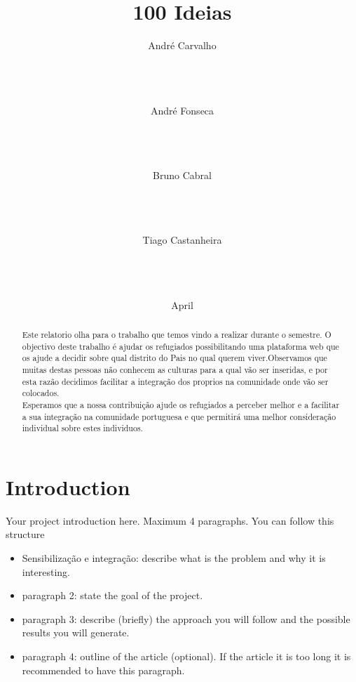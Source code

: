 \documentclass{article}
\title{100 Ideias}
\author{
%
%
\alignauthor
André Carvalho\\
       \affaddr{FCUP - DCC}\\
       \affaddr{Motivation Coach}\\
       \affaddr{Documenter}\\
\and
\alignauthor
André Fonseca\\
       \affaddr{FCUP - DCC}\\
       \affaddr{Task Master}\\
       \affaddr{Developer}\\
\and
\alignauthor Bruno Cabral\\
       \affaddr{FCUP - DCC}\\
       \affaddr{Resources Support}\\
       \affaddr{Researcher}\\
\and  %
\alignauthor Tiago Castanheira\\
       \affaddr{FCUP - DCC}\\
       \affaddr{Mediator}\\
       \affaddr{Architect}\\
}
\date{April}
\begin{document}
\maketitle
\begin{abstract}
    Este relatorio olha para o trabalho que temos vindo a realizar durante o semestre. O objectivo deste  trabalho é ajudar os refugiados possibilitando uma plataforma web que os ajude a decidir sobre qual distrito do Pais no qual querem viver.Observamos que muitas destas pessoas não conhecem as culturas para a qual vão ser inseridas, e por esta razão decidimos facilitar a integração dos proprios na comunidade onde vão ser colocados.\\Esperamos que a nossa contribuição ajude os refugiados a perceber melhor e a facilitar a sua integração na comunidade portuguesa e que permitirá uma melhor consideração individual sobre estes individuos.
    
    
\end{abstract}
\section{Introduction}



Your project introduction here. Maximum 4 paragraphs. You can
follow this structure

\begin{itemize}
    \item Sensibilização e integração: describe what is the problem and why it is
    interesting.
    \item paragraph 2: state the goal of the project.
    \item paragraph 3: describe (briefly) the approach you will
    follow and the possible results you will generate.
    \item paragraph 4: outline of the article (optional). If the
    article it is too long it is recommended to have this
    paragraph.


\end{itemize}

\section{}
\end{document}
